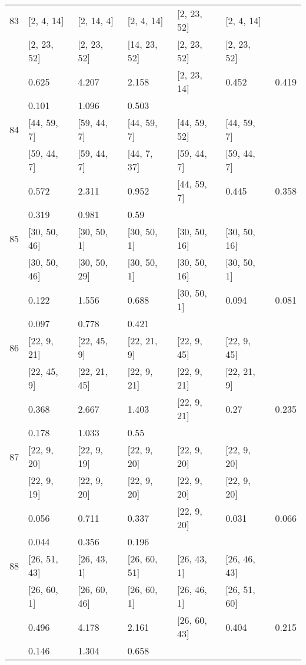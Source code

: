 \begin{longtable}{| l || l | l | l | l | l | l | }
\hline
83  & [2, 4, 14] & [2, 14, 4] & [2, 4, 14] & [2, 23, 52] & [2, 4, 14] \\
 & [2, 23, 52] & [2, 23, 52] & [14, 23, 52] & [2, 23, 52] & [2, 23, 52]\\
\hline
& 0.625 & 4.207 & 2.158 & [2, 23, 14] & 0.452 & 0.419\\
\hline
& 0.101 & 1.096 & 0.503 \\
\hline

\hline
84  & [44, 59, 7] & [59, 44, 7] & [44, 59, 7] & [44, 59, 52] & [44, 59, 7] \\
 & [59, 44, 7] & [59, 44, 7] & [44, 7, 37] & [59, 44, 7] & [59, 44, 7]\\
\hline
& 0.572 & 2.311 & 0.952 & [44, 59, 7] & 0.445 & 0.358\\
\hline
& 0.319 & 0.981 & 0.59 \\
\hline

\hline
85  & [30, 50, 46] & [30, 50, 1] & [30, 50, 1] & [30, 50, 16] & [30, 50, 16] \\
 & [30, 50, 46] & [30, 50, 29] & [30, 50, 1] & [30, 50, 16] & [30, 50, 1]\\
\hline
& 0.122 & 1.556 & 0.688 & [30, 50, 1] & 0.094 & 0.081\\
\hline
& 0.097 & 0.778 & 0.421 \\
\hline

\hline
86  & [22, 9, 21] & [22, 45, 9] & [22, 21, 9] & [22, 9, 45] & [22, 9, 45] \\
 & [22, 45, 9] & [22, 21, 45] & [22, 9, 21] & [22, 9, 21] & [22, 21, 9]\\
\hline
& 0.368 & 2.667 & 1.403 & [22, 9, 21] & 0.27 & 0.235\\
\hline
& 0.178 & 1.033 & 0.55 \\
\hline

\hline
87  & [22, 9, 20] & [22, 9, 19] & [22, 9, 20] & [22, 9, 20] & [22, 9, 20] \\
 & [22, 9, 19] & [22, 9, 20] & [22, 9, 20] & [22, 9, 20] & [22, 9, 20]\\
\hline
& 0.056 & 0.711 & 0.337 & [22, 9, 20] & 0.031 & 0.066\\
\hline
& 0.044 & 0.356 & 0.196 \\
\hline

\hline
88  & [26, 51, 43] & [26, 43, 1] & [26, 60, 51] & [26, 43, 1] & [26, 46, 43] \\
 & [26, 60, 1] & [26, 60, 46] & [26, 60, 1] & [26, 46, 1] & [26, 51, 60]\\
\hline
& 0.496 & 4.178 & 2.161 & [26, 60, 43] & 0.404 & 0.215\\
\hline
& 0.146 & 1.304 & 0.658 \\
\hline


\end{longtable}
